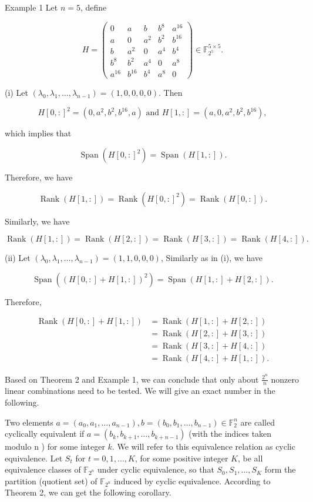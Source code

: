 \documentclass[10pt]{article}
\begin{document}
Example 1 Let $n=5$, define

$$
H=\left(\begin{array}{ccccc}
0 & a & b & b^{8} & a^{16} \\
a & 0 & a^{2} & b^{2} & b^{16} \\
b & a^{2} & 0 & a^{4} & b^{4} \\
b^{8} & b^{2} & a^{4} & 0 & a^{8} \\
a^{16} & b^{16} & b^{4} & a^{8} & 0
\end{array}\right) \in \mathbb{F}_{2^{5}}^{5 \times 5} .
$$

(i) Let $\left(\lambda_{0}, \lambda_{1}, \ldots, \lambda_{n-1}\right)=(1,0,0,0,0)$. Then

$$
H[0,:]^{2}=\left(0, a^{2}, b^{2}, b^{16}, a\right) \text { and } H[1,:]=\left(a, 0, a^{2}, b^{2}, b^{16}\right),
$$

which implies that

$$
\operatorname{Span}\left(H[0,:]^{2}\right)=\operatorname{Span}(H[1,:]) .
$$

Therefore, we have

$$
\operatorname{Rank}(H[1,:])=\operatorname{Rank}\left(H[0,:]^{2}\right)=\operatorname{Rank}(H[0,:]) .
$$

Similarly, we have

$$
\operatorname{Rank}(H[1,:])=\operatorname{Rank}(H[2,:])=\operatorname{Rank}(H[3,:])=\operatorname{Rank}(H[4,:]) .
$$

(ii) Let $\left(\lambda_{0}, \lambda_{1}, \ldots, \lambda_{n-1}\right)=(1,1,0,0,0)$, Similarly as in (i), we have

$$
\operatorname{Span}\left((H[0,:]+H[1,:])^{2}\right)=\operatorname{Span}(H[1,:]+H[2,:]) .
$$

Therefore,

$$
\begin{aligned}
\operatorname{Rank}(H[0,:]+H[1,:]) & =\operatorname{Rank}(H[1,:]+H[2,:]) \\
& =\operatorname{Rank}(H[2,:]+H[3,:]) \\
& =\operatorname{Rank}(H[3,:]+H[4,:]) \\
& =\operatorname{Rank}(H[4,:]+H[1,:]) .
\end{aligned}
$$

Based on Theorem 2 and Example 1, we can conclude that only about $\frac{2^{n}}{n}$ nonzero linear combinations need to be tested. We will give an exact number in the following.

Two elements $a=\left(a_{0}, a_{1}, \ldots, a_{n-1}\right), b=\left(b_{0}, b_{1}, \ldots, b_{n-1}\right) \in \mathbb{F}_{2}^{n}$ are called cyclically equivalent if $a=\left(b_{k}, b_{k+1}, \ldots, b_{k+n-1}\right)$ (with the indices taken modulo n ) for some integer $k$. We will refer to this equivalence relation as cyclic equivalence. Let $S_{t}$ for $t=0,1, \ldots, K$, for some positive integer $K$, be all equivalence classes of $\mathbb{F}_{2^{n}}$ under cyclic equivalence, so that $S_{0}, S_{1}, \ldots, S_{K}$ form the partition (quotient set) of $\mathbb{F}_{2^{n}}$ induced by cyclic equivalence. According to Theorem 2, we can get the following corollary.
\end{document}
